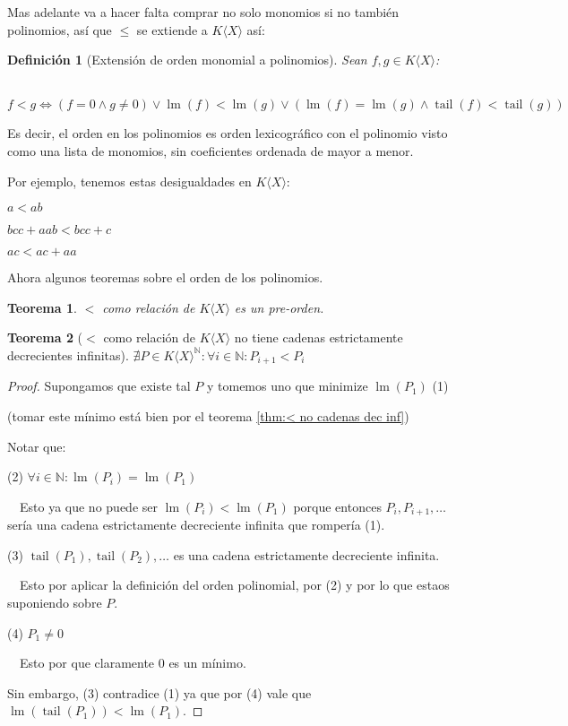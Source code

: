\documentclass{amsbook}
\theoremstyle{customstyle}
\newtheorem{definition}{Definición}[section]
\newtheorem{theorem}{Teorema}[section]
\DeclareMathOperator{\lm}{lm}
\DeclareMathOperator{\tail}{tail}
\begin{document}
Mas adelante va a hacer falta comprar no solo monomios si no también polinomios, así que $≤$ se extiende a $K⟨X⟩$ así:

\begin{definition}[Extensión de orden monomial a polinomios]
Sean $f, g ∈  K⟨X⟩$:

  $f < g ⇔ (f = 0 ∧ g ≠ 0) ∨ \lm(f) < \lm(g) ∨ (\lm(f) = \lm(g) ∧ \tail(f) < \tail(g))$

\end{definition}
Es decir, el orden en los polinomios es orden lexicográfico con el polinomio visto como una lista de monomios, sin coeficientes ordenada de mayor a menor.

Por ejemplo, tenemos estas desigualdades en $K⟨X⟩$:

$a < ab$

$bcc + aab < bcc + c$

$ac < ac + aa$

Ahora algunos teoremas sobre el orden de los polinomios.

\begin{theorem}
$<$ como relación de $K⟨X⟩$ es un pre-orden.
\end{theorem}

\begin{theorem}[$<$ como relación de $K⟨X⟩$ no tiene cadenas estrictamente decrecientes infinitas]\label{thm:< en KX no cadenas dec inf}
  $∄P ∈ K⟨X⟩^ℕ : ∀i ∈ ℕ : P_{i + 1} < P_i$
\end{theorem}
\begin{proof}
Supongamos que existe tal $P$ y tomemos uno que minimize $\lm(P_1)$ (1)

(tomar este mínimo está bien por el teorema \ref{thm:< no cadenas dec inf})

Notar que:

(2) $∀i ∈ ℕ : \lm(P_i) = \lm(P_1)$

  Esto ya que no puede ser $\lm(P_i) < \lm(P_1)$ porque entonces $P_i, P_{i + 1}, …$ sería una cadena estrictamente decreciente infinita que rompería (1).


(3) $\tail(P_1), \tail(P_2), …$ es una cadena estrictamente decreciente infinita.

  Esto por aplicar la definición del orden polinomial, por (2) y por lo que estaos suponiendo sobre $P$.

(4) $P_1 ≠ 0$

  Esto por que claramente $0$ es un mínimo.

Sin embargo, (3) contradice (1) ya que por (4) vale que $\lm(\tail(P_1)) < \lm(P_1)$.

\end{proof}
\end{document}
